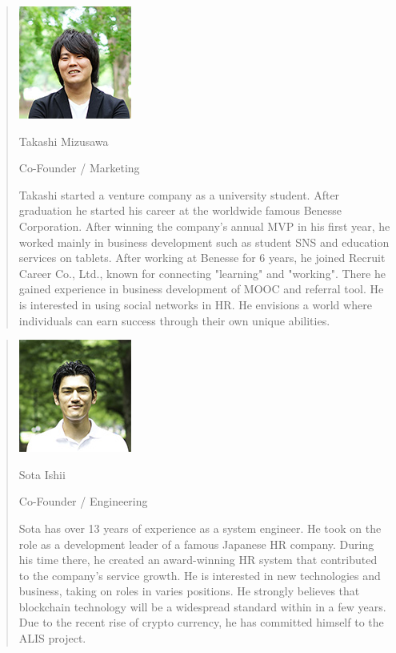 \documentclass{jsarticle}
\begin{document}
\begin{quote}
	\includegraphics{img/mizusawa.jpg}

Takashi Mizusawa

Co-Founder / Marketing

Takashi started a venture company as a university student. After graduation 
he started his career at the worldwide famous Benesse Corporation. After winning 
the company's annual MVP in his first year, he worked mainly in business 
development such as student SNS and education services on tablets. After working 
at Benesse for 6 years, he joined Recruit Career Co., Ltd., known for connecting 
"learning" and "working". There he gained experience in business development of 
MOOC and referral tool. He is interested in using social networks in HR. 
He envisions a world where individuals can earn success through their own unique abilities.
\end{quote}
\begin{quote}

	\includegraphics{img/ishii.jpg}

Sota Ishii

Co-Founder / Engineering

Sota has over 13 years of experience as a system engineer. He took on the 
role as a development leader of a famous Japanese HR company. During his 
time there, he created an award-winning HR system that contributed to the company's 
service growth. He is interested in new technologies and business, taking on roles in 
varies positions. He strongly believes that blockchain technology will be a widespread 
standard within in a few years. Due to the recent rise of crypto currency, he has 
committed himself to the ALIS project.
\end{quote}
\end{document}
